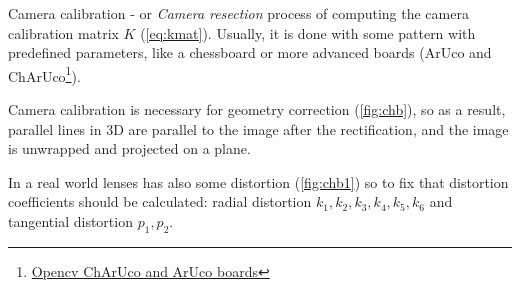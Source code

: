 Camera calibration - or \textit{Camera resection} process of computing the camera calibration matrix $K$ (\autoref{eq:kmat}).
Usually, it is done with some pattern with predefined parameters, like a chessboard or more advanced boards (ArUco and ChArUco\footnote{\href{https://docs.opencv.org/4.x/df/d4a/tutorial_charuco_detection.html}{Opencv ChArUco and ArUco boards}}).

Camera calibration is necessary for geometry correction (\autoref{fig:chb}), so as a result, parallel lines in 3D are parallel to the image after the rectification, and the image is unwrapped and projected on a plane.

In a real world lenses has also some distortion (\autoref{fig:chb1}) so to fix that distortion coefficients should be calculated: radial distortion $k_1, k_2, k_3, k_4, k_5, k_6$ and tangential distortion $p_1, p_2$.

